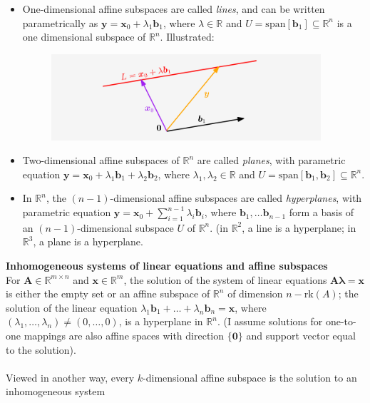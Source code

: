 \documentclass{report}
\begin{document}
\begin{itemize}
\item One-dimensional affine subspaces are called \textit{lines}, and can be written parametrically as 
$\bm{y}=\bm{x}_0+\lambda_1\bm{b}_1$, where $\lambda\in\mathbb{R}$ and 
$U=\text{span}[\bm{b}_1]\subseteq\mathbb{R}^n$ is a one dimensional subspace of $\mathbb{R}^n$. Illustrated:
\begin{figure}[h]
\includegraphics[width=10cm]{4}\\
\centering
\end{figure}
\item Two-dimensional affine subspaces of $\mathbb{R}^n$ are called \textit{planes}, with parametric equation
$\bm{y}=\bm{x}_0+\lambda_1\bm{b}_1+\lambda_2\bm{b}_2$, where $\lambda_1,\lambda_2\in\mathbb{R}$ 
and $U=\text{span}[\bm{b}_1,\bm{b}_2]\subseteq\mathbb{R}^n$.
\item In $\mathbb{R}^n$, the $(n-1)$-dimensional affine subspaces are called \textit{hyperplanes}, 
with parametric equation $\bm{y}=\bm{x}_0+\sum^{n-1}_{i=1}\lambda_i\bm{b}_i$, where
$\bm{b}_1,\ldots\bm{b}_{n-1}$ form a basis of an $(n-1)$-dimensional subspace $U$ of $\mathbb{R}^n$. (in $\mathbb{R}^2$, a line is a hyperplane; 
in $\mathbb{R}^3$, a plane is a hyperplane.
\end{itemize}
\textbf{Inhomogeneous systems of linear equations and affine subspaces}\\
For $\bm{A}\in\mathbb{R}^{m\times n}$ and $\bm{x}\in\mathbb{R}^m$, the solution of the system of 
linear equations $\bm{A\lambda}=\bm{x}$ is either the empty set or an affine subspace of $\mathbb{R}^n$ of 
dimension $n-\text{rk}(A)$; the solution of the linear equation 
$\lambda_1\bm{b}_1+\ldots+\lambda_n\bm{b}_n=\bm{x}$, where $(\lambda_1,\ldots,\lambda_n)\neq(0,\ldots,0)$, 
is a hyperplane in $\mathbb{R}^n$. (I assume solutions for one-to-one 
mappings are also affine spaces with direction 
$\{\mathbf{0}\}$ and support vector equal to the solution).\\
\vspace{1mm}\\
Viewed in another way, every $k$-dimensional affine subspace is the solution to an inhomogeneous system 
\end{document}
